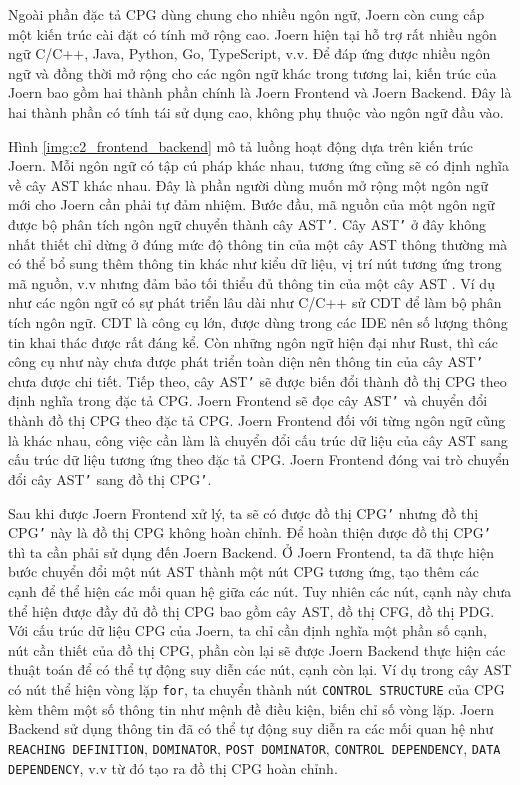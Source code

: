 Ngoài phần đặc tả CPG dùng chung cho nhiều ngôn ngữ, Joern còn cung cấp một kiến trúc cài đặt có tính mở rộng cao.
Joern hiện tại hỗ trợ rất nhiều ngôn ngữ C/C++, Java, Python, Go, TypeScript, v.v.
Để đáp ứng được nhiều ngôn ngữ và đồng thời mở rộng cho các ngôn ngữ khác trong tương lai, kiến trúc của Joern bao gồm hai thành phần chính là Joern Frontend và Joern Backend.
Đây là hai thành phần có tính tái sử dụng cao, không phụ thuộc vào ngôn ngữ đầu vào.

Hình \ref{img:c2_frontend_backend} mô tả luồng hoạt động dựa trên kiến trúc Joern.
Mỗi ngôn ngữ có tập cú pháp khác nhau, tương ứng cũng sẽ có định nghĩa về cây AST khác nhau.
Đây là phần người dùng muốn mở rộng một ngôn ngữ mới cho Joern cần phải tự đảm nhiệm.
Bước đầu, mã nguồn của một ngôn ngữ được bộ phân tích ngôn ngữ chuyển thành cây AST\texttt{'}.
Cây AST\texttt{'} ở đây không nhất thiết chỉ dừng ở đúng mức độ thông tin của một cây AST thông thường mà có thể bổ sung thêm thông tin khác như kiểu dữ liệu, vị trí nút tương ứng trong mã nguồn, v.v nhưng đảm bảo tối thiểu đủ thông tin của một cây AST .
Ví dụ như các ngôn ngữ có sự phát triển lâu dài như C/C++ sử CDT \cite{eclipseEclipseCC} để làm bộ phân tích ngôn ngữ.
CDT là công cụ lớn, được dùng trong các IDE nên số lượng thông tin khai thác được rất đáng kể.
Còn những ngôn ngữ hiện đại như Rust, thì các công cụ như này chưa được phát triển toàn diện nên thông tin của cây AST\texttt{'} chưa được chi tiết.
Tiếp theo, cây AST\texttt{'} sẽ được biến đổi thành đồ thị CPG theo định nghĩa trong đặc tả CPG.
Joern Frontend sẽ đọc cây AST\texttt{'} và chuyển đổi thành đồ thị CPG theo đặc tả CPG.
Joern Frontend đối với từng ngôn ngữ cũng là khác nhau, công việc cần làm là chuyển đổi cấu trúc dữ liệu của cây AST sang cấu trúc dữ liệu tương ứng theo đặc tả CPG.
Joern Frontend đóng vai trò chuyển đổi cây AST\texttt{'} sang đồ thị CPG\texttt{'}.

Sau khi được Joern Frontend xử lý, ta sẽ có được đồ thị CPG\texttt{'} nhưng đồ thị CPG\texttt{'} này là đồ thị CPG không hoàn chỉnh.
Để hoàn thiện được đồ thị CPG\texttt{'} thì ta cần phải sử dụng đến Joern Backend.
Ở Joern Frontend, ta đã thực hiện bước chuyển đổi một nút AST thành một nút CPG tương ứng, tạo thêm các cạnh để thể hiện các mối quan hệ giữa các nút.
Tuy nhiên các nút, cạnh này chưa thể hiện được đầy đủ đồ thị CPG bao gồm cây AST, đồ thị CFG, đồ thị PDG.
Với cấu trúc dữ liệu CPG của Joern, ta chỉ cần định nghĩa một phần số cạnh, nút cần thiết của đồ thị CPG, phần còn lại sẽ được Joern Backend thực hiện các thuật toán để có thể tự động suy diễn các nút, cạnh còn lại.
Ví dụ trong cây AST có nút thể hiện vòng lặp \texttt{for}, ta chuyển thành nút \texttt{CONTROL STRUCTURE} của CPG kèm thêm một số thông tin như mệnh đề điều kiện, biến chỉ số vòng lặp.
Joern Backend sử dụng thông tin đã có thể tự động suy diễn ra các mối quan hệ như \texttt{REACHING DEFINITION}, \texttt{DOMINATOR}, \texttt{POST DOMINATOR}, \texttt{CONTROL DEPENDENCY}, \texttt{DATA DEPENDENCY}, v.v từ đó tạo ra đồ thị CPG hoàn chỉnh.

